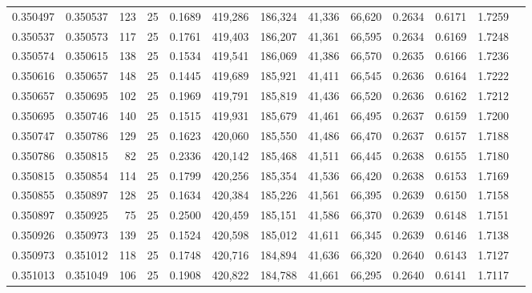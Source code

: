 \begin{tabular}{rrrrrrrrrrrrr}
0.350497 & 0.350537 &   123 &  25 &                                     0.1689 & 419,286 & 186,324 &  41,336 &  66,620 & 0.2634 & 0.6171 & 1.7259 \\
0.350537 & 0.350573 &   117 &  25 &                                     0.1761 & 419,403 & 186,207 &  41,361 &  66,595 & 0.2634 & 0.6169 & 1.7248 \\
0.350574 & 0.350615 &   138 &  25 &                                     0.1534 & 419,541 & 186,069 &  41,386 &  66,570 & 0.2635 & 0.6166 & 1.7236 \\
0.350616 & 0.350657 &   148 &  25 &                                     0.1445 & 419,689 & 185,921 &  41,411 &  66,545 & 0.2636 & 0.6164 & 1.7222 \\
0.350657 & 0.350695 &   102 &  25 &                                     0.1969 & 419,791 & 185,819 &  41,436 &  66,520 & 0.2636 & 0.6162 & 1.7212 \\
0.350695 & 0.350746 &   140 &  25 &                                     0.1515 & 419,931 & 185,679 &  41,461 &  66,495 & 0.2637 & 0.6159 & 1.7200 \\
0.350747 & 0.350786 &   129 &  25 &                                     0.1623 & 420,060 & 185,550 &  41,486 &  66,470 & 0.2637 & 0.6157 & 1.7188 \\
0.350786 & 0.350815 &    82 &  25 &                                     0.2336 & 420,142 & 185,468 &  41,511 &  66,445 & 0.2638 & 0.6155 & 1.7180 \\
0.350815 & 0.350854 &   114 &  25 &                                     0.1799 & 420,256 & 185,354 &  41,536 &  66,420 & 0.2638 & 0.6153 & 1.7169 \\
0.350855 & 0.350897 &   128 &  25 &                                     0.1634 & 420,384 & 185,226 &  41,561 &  66,395 & 0.2639 & 0.6150 & 1.7158 \\
0.350897 & 0.350925 &    75 &  25 &                                     0.2500 & 420,459 & 185,151 &  41,586 &  66,370 & 0.2639 & 0.6148 & 1.7151 \\
0.350926 & 0.350973 &   139 &  25 &                                     0.1524 & 420,598 & 185,012 &  41,611 &  66,345 & 0.2639 & 0.6146 & 1.7138 \\
0.350973 & 0.351012 &   118 &  25 &                                     0.1748 & 420,716 & 184,894 &  41,636 &  66,320 & 0.2640 & 0.6143 & 1.7127 \\
0.351013 & 0.351049 &   106 &  25 &                                     0.1908 & 420,822 & 184,788 &  41,661 &  66,295 & 0.2640 & 0.6141 & 1.7117 \\

\end{tabular}
